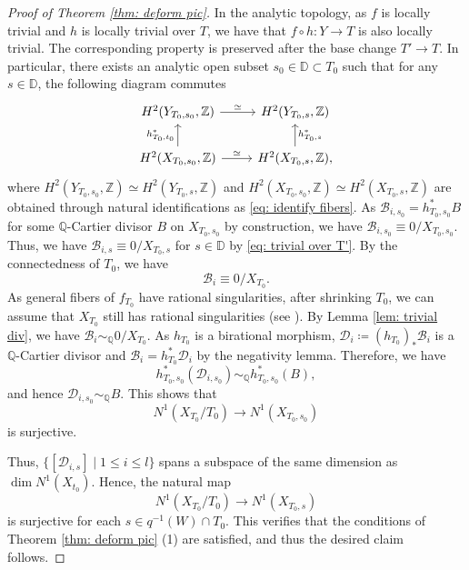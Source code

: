 \documentclass[11pt,oneside,reqno]{amsart}
\numberwithin{equation}{section}
\theoremstyle{definition}
\newcommand{\bD}{\mathbb{D}}
\newcommand{\bQ}{\mathbb{Q}}
\newcommand{\bZ}{\mathbb{Z}}
\newcommand{\mB}{\mathcal{B}}
\newcommand{\mD}{\mathcal{D}}
\begin{document}
\begin{proof}[Proof of Theorem \ref{thm: deform pic}]
In the analytic topology, as $f$ is locally trivial and $h$ is locally trivial over $T$, we have that $f\circ h: Y \to T$ is also locally trivial. The corresponding property is preserved after the base change $T' \to T$. In particular, there exists an analytic open subset $s_0\in \bD \subset T_0$ such that for any $s\in \mathbb D$, the following diagram commutes
\begin{equation}\label{eq: trivial over T'}
	\begin{tikzcd}
	 H^2(Y_{T_0,s_0}, \bZ)\arrow[r, "\simeq"] &H^2(Y_{T_0,s}, \bZ) \\
	 H^2(X_{T_0,s_0}, \bZ)\arrow[u, "h_{T_0, t_0}^*"]\arrow[r, "\simeq"] &H^2(X_{T_0,s}, \bZ) \arrow[u, "h_{T_0, s}^*", swap],
	\end{tikzcd}
\end{equation} where $H^2(Y_{T_0, s_0}, \bZ) \simeq H^2(Y_{T_0, s}, \bZ)$ and $H^2(X_{T_0, s_0}, \bZ)\simeq H^2(X_{T_0, s}, \bZ)$ are obtained through natural identifications as \eqref{eq: identify fibers}. As $\mB_{i,s_0} =h_{T_0,s_0}^*B$ for some $\bQ$-Cartier divisor $B$ on $X_{T_0,s_0}$ by construction, we have $\mB_{i,s_0} \equiv 0/X_{T_0,s_0}$. Thus, we have $\mB_{i,s} \equiv 0/X_{T_0,s}$ for $s\in \bD$ by \eqref{eq: trivial over T'}. By the connectedness of $T_0$, we have
\[
\mB_i \equiv 0/X_{T_0}.
\] 
As general fibers of $f_{T_0}$ have rational singularities, after shrinking $T_0$, we can assume that $X_{T_0}$ still has rational singularities (see \cite[Théorème 2]{Elk78}). By Lemma \ref{lem: trivial div}, we have $\mB_i \sim_\bQ 0/X_{T_0}$. As $h_{T_0}$ is a birational morphism, $\mD_i\coloneqq (h_{T_0})_*\mB_i$ is a $\bQ$-Cartier divisor and $\mB_i=h_{T_0}^*\mD_i$ by the negativity lemma. Therefore, we have 
\[
h^*_{T_0,s_0}(\mD_{i,s_0})\sim_\bQ h^*_{T_0,s_0}(B),
\] and hence $\mD_{i,s_0}\sim_\bQ B$. This shows that
\[
N^1(X_{T_0}/T_0) \to N^1(X_{T_0,s_0})
\] is surjective. 

Thus, $\{[\mD_{i,s}] \mid 1 \leq i \leq l\}$ spans a subspace of the same dimension as $\dim N^1(X_{t_0})$. Hence, the natural map 
\[
N^1(X_{T_0}/T_0) \to N^1(X_{T_0,s})
\] is surjective for each $s\in q^{-1}(W)\cap T_0$. This verifies that the conditions of Theorem \ref{thm: deform pic} (1) are satisfied, and thus the desired claim follows.
\end{proof}
\end{document}
